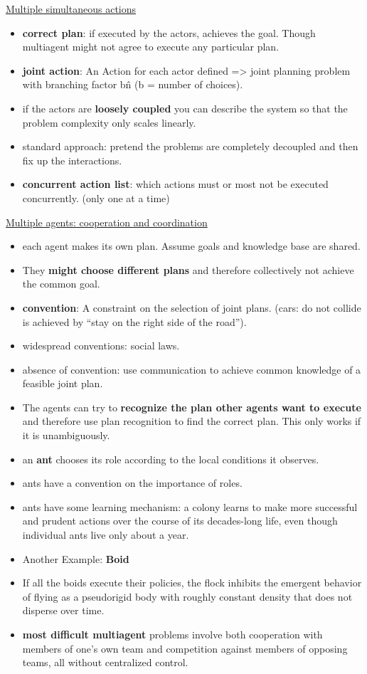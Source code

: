 \underline{Multiple simultaneous actions}
\begin{itemize}[noitemsep,nolistsep]
	\item \textbf{correct plan}: if executed by the actors, achieves the goal. Though multiagent might not agree to execute any particular plan.
	\item \textbf{joint action}: An Action for each actor defined => joint planning problem with branching factor b\^n (b = number of choices).
	\item if the actors are \textbf{loosely coupled} you can describe the system so that the problem complexity only scales linearly.
	\item standard approach: pretend the problems are completely decoupled and then fix up the interactions.
	\item \textbf{concurrent action list}: which actions must or most not be executed concurrently. (only one at a time)
\end{itemize}

\underline{Multiple agents: cooperation and coordination}
\begin{itemize}[noitemsep,nolistsep]
	\item each agent makes its own plan. Assume goals and knowledge base are shared.
	\item They \textbf{might choose different plans} and therefore collectively not achieve the common goal.
	\item \textbf{convention}: A constraint on the selection of joint plans. (cars: do not collide is achieved by “stay on the right side of the road”).
	\item widespread conventions: social laws.
	\item absence of convention: use communication to achieve common knowledge of a feasible joint plan.
	\item The agents can try to \textbf{recognize the plan other agents want to execute} and therefore use plan recognition to find the correct plan. This only works if it is unambiguously.
	\item an \textbf{ant} chooses its role according to the local conditions it observes.
	\item ants have a convention on the importance of roles.
	\item ants have some learning mechanism: a colony learns to make more successful and prudent actions over the course of its decades-long life, even though individual ants live only about a year.
	\item Another Example: \textbf{Boid}
	\item If all the boids execute their policies, the flock inhibits the emergent behavior of flying as a pseudorigid body with roughly constant density that does not disperse over time.
	\item \textbf{most difficult multiagent} problems involve both cooperation with members of one’s own team and competition against members of opposing teams, all without centralized control.
\end{itemize}

